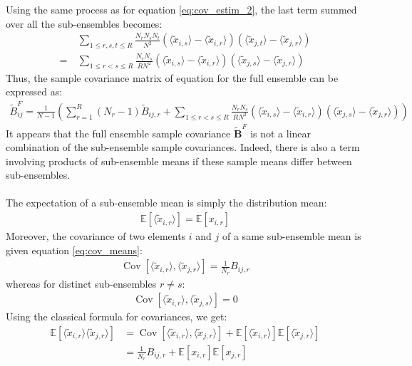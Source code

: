 \documentclass[12pt]{scrartcl}
\DeclareMathOperator{\Cov}{Cov}
\begin{document}
Using the same process as for equation \eqref{eq:cov_estim_2}, the last term summed over all the sub-ensembles becomes:
\begin{align}
& \sum_{1 \le r,s,t \le R} \frac{N_r N_s N_t}{N^2} \left(\langle \widetilde{x}_{i,s} \rangle - \langle \widetilde{x}_{i,r} \rangle \right) \left(\langle \widetilde{x}_{j,t} \rangle - \langle \widetilde{x}_{j,r} \rangle \right) \nonumber \\
= \ & \sum_{1 \le r < s \le R} \frac{N_r N_s}{R N^2} \left(\langle \widetilde{x}_{i,s} \rangle - \langle \widetilde{x}_{i,r} \rangle \right) \left(\langle \widetilde{x}_{j,s} \rangle - \langle \widetilde{x}_{j,r} \rangle \right)
\end{align}
Thus, the sample covariance matrix of equation for the full ensemble can be expressed as:
\begin{align}
\widetilde{B}^F_{ij} =  \frac{1}{N-1} \left(\sum_{r=1}^R \left(N_r-1\right) \widetilde{B}_{ij,r} + \sum_{1 \le r < s \le R} \frac{N_r N_s}{R N^2} \left(\langle \widetilde{x}_{i,s} \rangle - \langle \widetilde{x}_{i,r} \rangle \right) \left(\langle \widetilde{x}_{j,s} \rangle - \langle \widetilde{x}_{j,r} \rangle \right) \right)
\end{align}
It appears that the full ensemble sample covariance $\widetilde{\mathbf{B}}^F$ is not a linear combination of the sub-ensemble sample covariances. Indeed, there is also a term involving products of sub-ensemble means if these sample means differ between sub-ensembles.\\
$  $\\
The expectation of a sub-ensemble mean is simply the distribution mean:
\begin{align}
\mathbb{E} \left[\langle \widetilde{x}_{i,r} \rangle \right] = \mathbb{E} \left[x_{i,r} \right]
\end{align}
Moreover, the covariance of two elements $i$ and $j$ of a same sub-ensemble mean is given equation \eqref{eq:cov_means}:
\begin{align}
\Cov \left[\langle \widetilde{x}_{i,r} \rangle,\langle \widetilde{x}_{j,r} \rangle \right] = \frac{1}{N_r} B_{ij,r}
\end{align}
whereas for distinct sub-ensembles $r \ne s$:
\begin{align}
\Cov \left[\langle \widetilde{x}_{i,r} \rangle,\langle \widetilde{x}_{j,s} \rangle \right] = 0
\end{align}
Using the classical formula for covariances, we get:
\begin{align}
\mathbb{E} \left[\langle \widetilde{x}_{i,r} \rangle \langle \widetilde{x}_{j,r} \rangle\right] & = \Cov \left[\langle \widetilde{x}_{i,r} \rangle,\langle \widetilde{x}_{j,r} \rangle \right] + \mathbb{E} \left[\langle \widetilde{x}_{i,r} \rangle \right] \mathbb{E} \left[ \langle \widetilde{x}_{j,r} \rangle\right] \nonumber \\
& = \frac{1}{N_r} B_{ij,r} + \mathbb{E} \left[x_{i,r} \right] \mathbb{E} \left[x_{j,r} \right]
\end{align}
\end{document}
